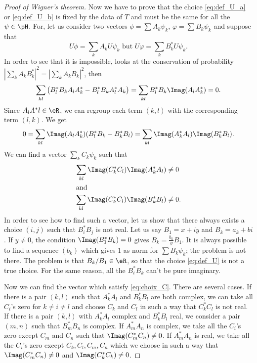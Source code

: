 \begin{proof}[Proof of Wigner's theorem]
Now we have to prove that the choice \eqref{eq:def_U_a} or \eqref{eq:def_U_b} is fixed by the data of $T$ and must be the same for all the $\psi\in\pH$. For, let us consider two vectors $\phi=\sum A_k\psi_k$, $\varphi=\sum B_k\psi_k$ and suppose that
\[
   U\phi=\sum_k A_k U\psi_k\text{ but } U\varphi=\sum_kB^*_k U\psi_k.
\]   
In order to see that it is impossible, looks at the conservation of probability $|\sum_k A_kB^*_k|^2=|\sum_k A_kB_k|^2$, then
\begin{equation}
\sum_{kl}\big(   B^*_lB_kA_lA^*_k-B^*_lB_kA^*_lA_k    \big)=\sum_{kl}B^*_lB_k\Imag(A_lA^*_k)=0.
\end{equation}
Since $A_lA^*l\in\eR$, we can regroup each term $(k,l)$ with the corresponding term $(l,k)$. We get
\begin{equation}\label{eq:imim_zero}
\begin{split}
  0=\sum_{kl}\Imag(A_lA^*_k)(B^*_lB_k-B^*_kB_l)
   =\sum_{kl}\Imag(A^*_kA_l)\Imag(B^*_kB_l).
\end{split}   
\end{equation}
We can find a vector $\sum_kC_k\psi_k$ such that 
\begin{subequations}\label{eq:choix_C}
\begin{align}
 \sum_{kl}\Imag(C^*_kC_l)\Imag(A^*_kA_l)&\neq 0  \label{eq:choix_C_a}\\
\intertext{and}
 \sum_{kl}\Imag(C^*_kC_l)\Imag(B^*_kB_l)&\neq 0.
\end{align}
\end{subequations}
In order to see how to find such a vector, let us show that there always exists a choice $(i,j)$ such that $B^*_iB_j$ is not real. Let us say $B_1=x+iy$ and $B_k=a_k+bi$. If $y\neq 0$, the condition $\Imag(B_1^*B_k)=0$ gives $B_k=\frac{b_k}{y}B_1$. It is always possible to find a sequence $(b_k)$ which gives $1$ as norm for $\sum B_k\psi_k$; the problem is not there. The problem is that $B_k/B_1\in\eR$, so that the choice \eqref{eq:def_U}  is not a true choice. For the same reason, all the $B^*_iB_k$ can't be pure imaginary.

Now we can find the vector which satisfy \eqref{eq:choix_C}. There are several cases. If there is a pair $(k,l)$ such that $A^*_kA_l$ and $B^*_kB_l$ are both complex, we can take all $C_i$'s zero for $k\neq i\neq l$ and choose $C_k$ and $C_l$ in such a way that $C^*_kC_l$ is not real. If there is a pair $(k,l)$ with $A^*_kA_l$ complex and $B^*_kB_l$ real, we consider a pair $(m,n)$ such that $B^*_mB_n$ is complex. If $A^*_mA_n$ is complex, we take all the $C_i$'s zero except $C_m$ and $C_n$ such that $\Imag(C^*_mC_n)\neq 0$. If $A^*_mA_n$ is real, we take all the $C_i$'s zero except $C_k,C_l,C_m,C_n$ which we choose in such a way that $\Imag(C^*_mC_n)\neq 0$ and $\Imag(C^*_kC_k)\neq 0$.


\end{proof}
